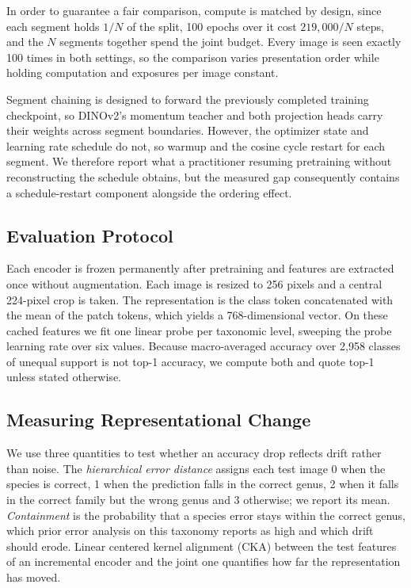 \documentclass[english]{lni}
\begin{document}
In order to guarantee a fair comparison, compute is matched by design, since each segment holds $1/N$ of the split, 100 epochs over it cost $219{,}000/N$ steps, and the $N$ segments together spend the joint budget. Every image is seen exactly 100 times in both settings, so the comparison varies presentation order while holding computation and exposures per image constant.

Segment chaining is designed to forward the previously completed training checkpoint, so DINOv2's momentum teacher and both projection heads carry their weights across segment boundaries. However, the optimizer state and learning rate schedule do not, so warmup and the cosine cycle restart for each segment. We therefore report what a practitioner resuming pretraining without reconstructing the schedule obtains, but the measured gap consequently contains a schedule-restart component \cite{Loshchilov2017} alongside the ordering effect.

\subsection{Evaluation Protocol}\label{sec:eval}

Each encoder is frozen permanently after pretraining and features are extracted once without augmentation. Each image is resized to 256 pixels and a central 224-pixel crop is taken. The representation is the class token concatenated with the mean of the patch tokens, which yields a 768-dimensional vector. On these cached features we fit one linear probe per taxonomic level, sweeping the probe learning rate over six values. Because macro-averaged accuracy over 2,958 classes of unequal support is not top-1 accuracy, we compute both and quote top-1 unless stated otherwise.

\subsection{Measuring Representational Change}\label{sec:mechanism}

We use three quantities to test whether an accuracy drop reflects drift rather than noise. The \emph{hierarchical error distance} assigns each test image 0 when the species is correct, 1 when the prediction falls in the correct genus, 2 when it falls in the correct family but the wrong genus and 3 otherwise; we report its mean. \emph{Containment} is the probability that a species error stays within the correct genus, which prior error analysis on this taxonomy reports as high \cite{Jain2025} and which drift should erode. Linear centered kernel alignment (CKA) \cite{Kornblith2019} between the test features of an incremental encoder and the joint one quantifies how far the representation has moved.
\end{document}
